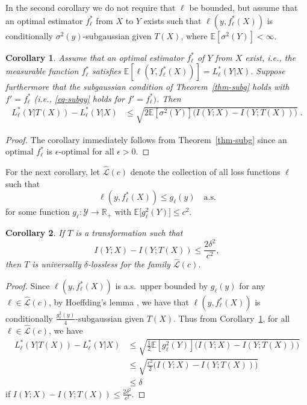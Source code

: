 \documentclass[11pt]{article}
\newtheorem{cor}{Corollary}
\def\R{{\mathbb R}}
\def\Y{\mathcal{Y}}
\def\L{\mathcal{L}}
\def\EXP {{\mathbb E}}
\begin{document}
In the second corollary we do not require that $\ell$ be bounded, but
assume that an optimal estimator $f^*_\ell$ from $X$ to $Y$ exists such
that $\ell(y,f^*_\ell(X))$ is conditionally  $\sigma^2(y)$-subgaussian given $T(X)$, where $\EXP[\sigma^2(Y)]<\infty$. 



\begin{cor}
  \label{cor2}
  Assume that an optimal estimator $f^*_\ell$ of $Y$ from $X$ exist, i.e., the
  measurable function $f^*_\ell$ satisfies $\EXP[\ell(Y,f^*_\ell(X))] =
  L_\ell^*(Y|X)$. Suppose furthermore that the subgaussian condition of Theorem~\ref{thm-subg} holds with $f'=f^*_\ell$ (i.e., \eqref{eq-subgy}  holds for $f'=f^*_\ell)$. Then 
  \begin{align}
 L_\ell^*(Y|T(X))- L_\ell^*(Y|X)  &  \le \sqrt{2\EXP[\sigma^2(Y)] \big( I(Y;X)-I(Y;T(X)) \big) }\; .  \label{eq4}   
  \end{align}
\end{cor}


\begin{proof}
  The corollary immediately follows from Theorem~\ref{thm-subg} since
  an optimal   $f^*_\ell$ is $\epsilon$-optimal for all $\epsilon>0$.
  \end{proof}

For the next corollary, let $\widehat{\L}(c)$ denote the collection of all loss functions $\ell$ such that 
\[
\ell(y,f^*_\ell(X)) \le g_\ell(y)  \quad \text{a.s.} 
\]
for some function $g_\ell:\Y\to \R_+$ with $\EXP\big[ g_\ell^2(Y)\big] \le c^2$. 

\begin{cor}
  \label{cor2a}
If $T$ is a transformation such that 
\[
 I(Y;X)-I(Y;T(X)) \le \frac{2\delta^2}{c^2},
\]
then  $T$ is universally $\delta$-lossless  for the family $\widehat{\L}(c)$.
\end{cor}

\begin{proof}
Since   $\ell(y,f^*_\ell(X))$ is a.s.\ upper bounded by $g_\ell(y)$
for any $\ell\in \widehat{\L}(c)$, by  Hoeffding's lemma
\cite[Lemma~2.2]{BuLuMa13},  we have that  $\ell(y,f^*_\ell(X)) $ is conditionally  $\frac{g_\ell^2(y)}{4}$-subgaussian given $T(X)$. Thus from Corollary~\ref{cor2}, for all  $\ell\in \widehat{\L}(c)$, we have 
\begin{align*}
L_\ell^*(Y|T(X))- L_\ell^*(Y|X)   &  \le \sqrt{\frac{1}{2}\EXP[g_\ell^2(Y)] \big( I(Y;X)-I(Y;T(X)) \big) } \\
& \le  \sqrt{\frac{c^2}{2} \big( I(Y;X)-I(Y;T(X)) \big) }\\
&\le \delta 
\end{align*} 
if $I(Y;X)-I(Y;T(X)) \le \frac{2\delta^2}{c^2}$. 
\end{proof} 
\end{document}
